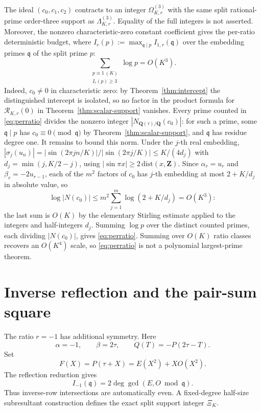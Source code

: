 The ideal $(c_0,c_1,c_2)$ contracts to an integer
$\Omega_{K,r}^{(3)}$ with the same split rational-prime order-three support as
$\Lambda_{K,r}^{(3)}$.  Equality of the full integers is not asserted.
Moreover, the nonzero characteristic-zero constant coefficient gives the
per-ratio deterministic budget, where
$I_r(p):=\max_{\mathfrak q\mid p}I_{1,r}(\mathfrak q)$ over the embedding
primes $\mathfrak q$ of the split prime $p$:
\begin{equation}\label{eq:perratio}
\sum_{\substack{p\equiv1\,(K)\\I_r(p)\ge3}}\log p=O(K^3).
\end{equation}
Indeed, $c_0\ne0$ in characteristic zero: by
Theorem~\ref{thm:intercept} the distinguished intercept is isolated, so no
factor in the product formula for $\mathcal R_{K,r}(0)$ in
Theorem~\ref{thm:scalar-support} vanishes.  Every prime counted in
\eqref{eq:perratio} divides the nonzero integer
$|N_{\mathbf Q(\tau)/\mathbf Q}(c_0)|$: for such a prime, some
$\mathfrak q\mid p$ has $c_0\equiv0\pmod{\mathfrak q}$ by
Theorem~\ref{thm:scalar-support}, and $\mathfrak q$ has residue degree
one.  It remains to bound this norm.  Under the $j$-th real embedding,
$|\sigma_j(u_n)|=|\sin(2\pi jn/K)|/|\sin(2\pi j/K)|\le K/(4d_j)$ with
$d_j=\min(j,K/2-j)$, using $|\sin\pi x|\ge2\,\mathrm{dist}(x,\mathbf Z)$.
Since $\alpha_r=u_r$ and $\beta_r=-2u_{r-1}$, each of the $m^2$ factors of
$c_0$ has $j$-th embedding at most $2+K/d_j$ in absolute value, so
\[
\log|N(c_0)|
 \le m^2\sum_{j=1}^m\log(2+K/d_j)=O(K^3):
\]
the last sum is $O(K)$ by the elementary Stirling estimate applied to the
integers and half-integers $d_j$.  Summing $\log p$ over the distinct
counted primes, each dividing $|N(c_0)|$, gives \eqref{eq:perratio}.
Summing over $O(K)$ ratio classes recovers an $O(K^4)$ scale, so
\eqref{eq:perratio} is not a polynomial largest-prime theorem.

\section{Inverse reflection and the pair-sum square}

The ratio $r=-1$ has additional symmetry.  Here
\[
\alpha=-1,\qquad \beta=2\tau,
\qquad Q(T)=-P(2\tau-T).
\]
Set
\begin{equation}\label{eq:FEO}
F(X)=P(\tau+X)=E(X^2)+XO(X^2).
\end{equation}
The reflection reduction gives
\begin{equation}\label{eq:inverse-gcd}
I_{-1}(\mathfrak q)=2\deg\gcd(E,O\bmod\mathfrak q).
\end{equation}
Thus inverse-row intersections are automatically even.  A fixed-degree
half-size subresultant construction defines the exact split support integer
$\Xi_K$.

